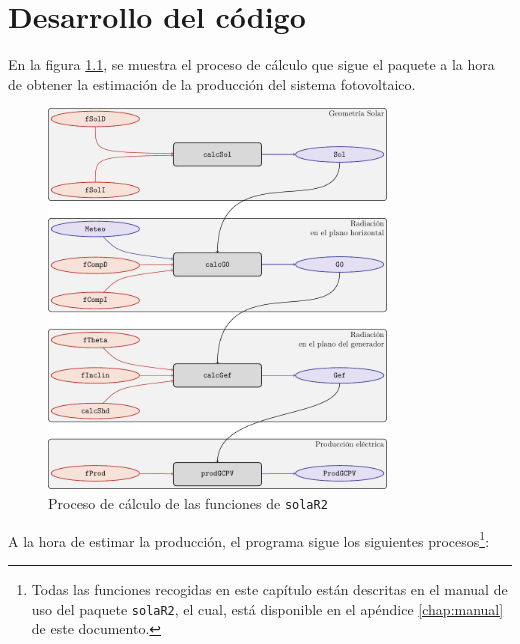 \chapter{Desarrollo del código}
\label{chap:desarrollo-codigo}
En la figura \ref{fig:org093ef10}, se muestra el proceso de cálculo que sigue el paquete a la hora de obtener la estimación de la producción del sistema fotovoltaico.
\begin{figure}[htbp]
\centering
\includegraphics[keepaspectratio,width=0.8\textwidth,height=0.43\textheight]{figuras/procedure.pdf}
\caption{\label{fig:org093ef10}Proceso de cálculo de las funciones de \texttt{solaR2}}
\end{figure}
A la hora de estimar la producción, el programa sigue los siguientes procesos\footnote{Todas las funciones recogidas en este capítulo están descritas en el manual de uso del paquete \texttt{solaR2}, el cual, está disponible en el apéndice \ref{chap:manual} de este documento.}:
